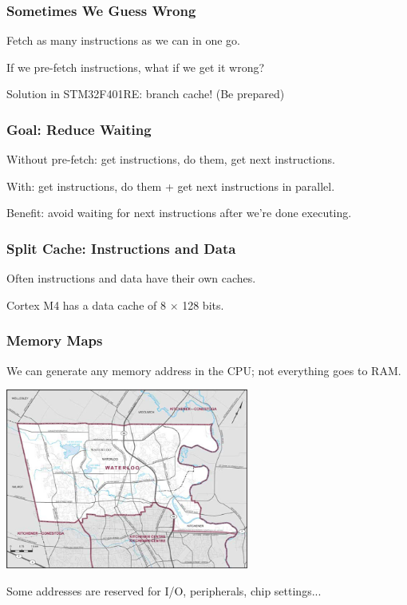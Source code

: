 \begin{frame}
\frametitle{Sometimes We Guess Wrong}

Fetch as many instructions as we can in one go.

If we pre-fetch instructions, what if we get it wrong?

Solution in STM32F401RE: branch cache! (Be prepared)

\end{frame}

\begin{frame}
\frametitle{Goal: Reduce Waiting}

Without pre-fetch: get instructions, do them, get next instructions.

With: get instructions, do them + get next instructions in parallel.

Benefit: avoid waiting for next instructions after we're done executing.

\end{frame}

\begin{frame}
\frametitle{Split Cache: Instructions and Data}

Often instructions and data have their own caches.

Cortex M4 has a data cache of 8 $\times$ 128 bits.

\end{frame}

\begin{frame}
\frametitle{Memory Maps}

We can generate any memory address in the CPU; not everything goes to RAM.

\begin{center}
  \includegraphics[width=0.6\textwidth]{images/waterloo.jpg}
\end{center}

Some addresses are reserved for I/O, peripherals, chip settings...

\end{frame}

